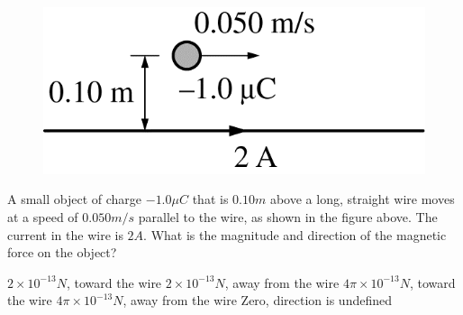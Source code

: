 \begin{figure}[H]
    \centering
    \includegraphics[scale=0.3]{images/img-002-002.png}
\end{figure}

\begin{questions}\setcounter{question}{0}\question
A small object of charge $-1.0 \unit{\mu C}$ that is $0.10 \unit{m}$ above a long, straight wire moves at a speed of $0.050 \unit{m/s}$ parallel to the wire, as shown in the figure above. The current in the wire is $2 \unit{A}$. What is the magnitude and direction of the magnetic force on the object?

\begin{choices}
\choice $2     \times 10^{-13} \unit{N}$, toward the wire
\choice $2     \times 10^{-13} \unit{N}$, away from the wire
\choice $4 \pi \times 10^{-13} \unit{N}$, toward the wire
\choice $4 \pi \times 10^{-13} \unit{N}$, away from the wire
\choice Zero, direction is undefined
\end{choices}\end{questions}
